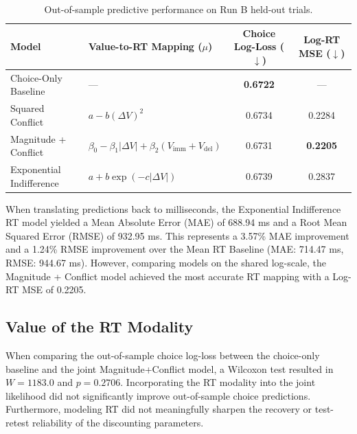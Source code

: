 \documentclass[11pt,a4paper]{article}
\theoremstyle{definition}
\begin{document}
\begin{table}[h!]
    \centering
    \small
    \begin{tabular}{llcc}
        \toprule
        \textbf{Model}
        & \textbf{Value-to-RT Mapping ($\mu$)}
        & \textbf{Choice Log-Loss} ($\downarrow$)
        & \textbf{Log-RT MSE} ($\downarrow$) \\
        \midrule
        Choice-Only Baseline
        & ---
        & \textbf{0.6722}
        & --- \\

        Squared Conflict
        & $a - b(\Delta V)^2$
        & 0.6734
        & 0.2284 \\

        Magnitude + Conflict
        & $\beta_0 - \beta_1|\Delta V| + \beta_2(V_{\text{imm}} + V_{\text{del}})$
        & 0.6731
        & \textbf{0.2205} \\

        Exponential Indifference
        & $a + b \exp(-c|\Delta V|)$
        & 0.6739
        & 0.2837 \\

        \bottomrule
    \end{tabular}

    \caption{Out-of-sample predictive performance on Run B held-out trials.}
    \label{tab:predictive_perf}
\end{table}

When translating predictions back to milliseconds, the Exponential Indifference RT model yielded a Mean Absolute Error (MAE) of 688.94 ms and a Root Mean Squared Error (RMSE) of 932.95 ms. This represents a 3.57\% MAE improvement and a 1.24\% RMSE improvement over the Mean RT Baseline (MAE: 714.47 ms, RMSE: 944.67 ms). However, comparing models on the shared log-scale, the Magnitude + Conflict model achieved the most accurate RT mapping with a Log-RT MSE of 0.2205.

\subsection{Value of the RT Modality}

When comparing the out-of-sample choice log-loss between the choice-only baseline and the joint Magnitude+Conflict model, a Wilcoxon test resulted in $W=1183.0$ and $p=0.2706$. Incorporating the RT modality into the joint likelihood did not significantly improve out-of-sample choice predictions. Furthermore, modeling RT did not meaningfully sharpen the recovery or test-retest reliability of the discounting parameters.
\end{document}
